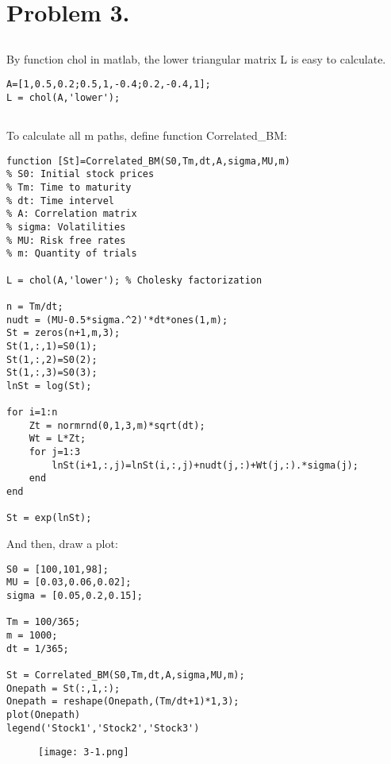 \documentclass{article}
\begin{document}
\section{Problem 3.}
\subsection{}
By function chol in matlab, the lower triangular matrix L is easy to calculate.
\begin{verbatim}
A=[1,0.5,0.2;0.5,1,-0.4;0.2,-0.4,1];
L = chol(A,'lower');
\end{verbatim}

\subsection{}

To calculate all m paths, define function Correlated\_BM:
\begin{verbatim}
function [St]=Correlated_BM(S0,Tm,dt,A,sigma,MU,m)
% S0: Initial stock prices
% Tm: Time to maturity
% dt: Time intervel
% A: Correlation matrix
% sigma: Volatilities
% MU: Risk free rates
% m: Quantity of trials

L = chol(A,'lower'); % Cholesky factorization

n = Tm/dt;
nudt = (MU-0.5*sigma.^2)'*dt*ones(1,m);
St = zeros(n+1,m,3);
St(1,:,1)=S0(1);
St(1,:,2)=S0(2);
St(1,:,3)=S0(3);
lnSt = log(St);

for i=1:n
    Zt = normrnd(0,1,3,m)*sqrt(dt);
    Wt = L*Zt;
    for j=1:3
        lnSt(i+1,:,j)=lnSt(i,:,j)+nudt(j,:)+Wt(j,:).*sigma(j);
    end
end

St = exp(lnSt);
\end{verbatim}

And then, draw a plot:
\begin{verbatim}
S0 = [100,101,98];
MU = [0.03,0.06,0.02];
sigma = [0.05,0.2,0.15];

Tm = 100/365;
m = 1000;
dt = 1/365;

St = Correlated_BM(S0,Tm,dt,A,sigma,MU,m);
Onepath = St(:,1,:);
Onepath = reshape(Onepath,(Tm/dt+1)*1,3);
plot(Onepath)
legend('Stock1','Stock2','Stock3')
\end{verbatim}

\begin{figure}[h] 
\begin{center} 
\texttt{[image: 3-1.png]}  
\caption{} 
\end{center} 
\end{figure}
\end{document}
